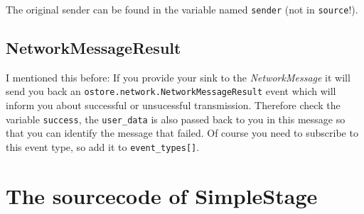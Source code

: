 \documentclass[twocolumn, twoside, a4paper]{article}
\begin{document}
The original sender can be found in the variable named \texttt{sender}
(not in \texttt{source}!).


\subsection{NetworkMessageResult}
\label{sec:networkmessageresult}

I mentioned this before: If you provide your sink to the \emph{NetworkMessage} it
will send you back an \texttt{ostore.network.NetworkMessageResult} event
which will inform you about successful or unsucessful
transmission. Therefore check the variable \texttt{success}, the
\texttt{user\_data} is also passed back to you in this message so that you
can identify the message that failed. Of course you need to subscribe
to this event type, so add it to \texttt{event\_types[]}.


\onecolumn
\section{The sourcecode of SimpleStage}
\label{sec:source}

\lstset{language=Java, basicstyle=\small, showstringspaces=false,
  numbers=left, numberstyle=\tiny, numberfirstline=true, stepnumber=5,
  numbersep=5pt}


\end{document}
